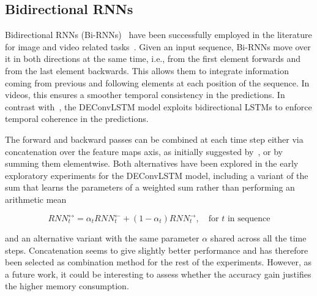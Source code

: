 \subsection{Bidirectional RNNs}\label{deconvLSTM_biRNN}
Bidirectional RNNs (Bi-RNNs)~\citep{Schuster1997bidirecrnn} have been
successfully employed in the literature for image and video related
tasks~\citep{Graves+Schmidhuber-2009,visin2015renet,Du2015_CVPR,
Visin_2016_CVPR_Workshops}. Given an input sequence, Bi-RNNs move over it in
both directions at the same time, i.e., from the first element forwards and
from the last element backwards. This allows them to integrate information
coming from previous and following elements at each position of the sequence.
In videos, this ensures a smoother temporal consistency in the predictions. In
contrast with~\citep{ShiCWYWW15}, the DEConvLSTM model exploits bidirectional
LSTMs to enforce temporal coherence in the predictions.

The forward and backward passes can be combined at each time step either via
concatenation over the feature maps axis, as initially suggested by~\citep{
Schuster1997bidirecrnn}, or by summing them elementwise. Both alternatives have
been explored in the early exploratory experiments for the DEConvLSTM model,
including a variant of the sum that learns the parameters of a weighted sum
rather than performing an arithmetic mean

\begin{equation}
    RNN_t^{\leftrightarrow} = \alpha_t RNN_t^{\leftarrow} +
        (1 - \alpha_t) RNN_t^{\rightarrow}, \quad\text{for $t$ in sequence}
\end{equation}

\noindent and an alternative variant with the same parameter $\alpha$ shared
across all the time steps. Concatenation seems to give slightly better
performance and has therefore been selected as combination method for the
rest of the experiments. However, as a future work, it could be interesting to
assess whether the accuracy gain justifies the higher memory consumption.


